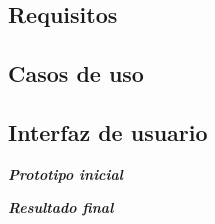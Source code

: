 
    \subsection{Requisitos}
    \subsection{Casos de uso}
    \subsection{Interfaz de usuario}
        \textit{\textbf{Prototipo inicial}}
        
        \textit{\textbf{Resultado final}}